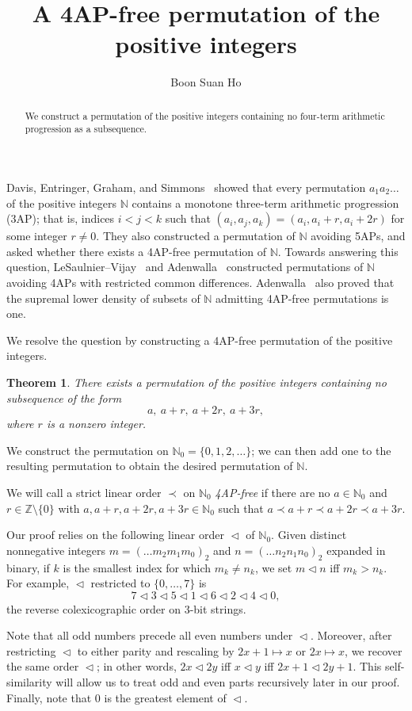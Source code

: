 \documentclass[12pt,reqno]{amsart}
\title{A 4AP-free permutation of the positive integers}
\author{Boon Suan Ho}
\date{}
\newtheorem*{theorem}{Theorem}
\newcommand{\NN}{\mathbb N}
\newcommand{\ZZ}{\mathbb Z}
\newcommand{\bits}{\mathrel{\triangleleft}}
\begin{document}
\begin{abstract}
We construct a permutation of the positive integers containing no four-term
arithmetic progression as a subsequence.
\end{abstract}

\maketitle

Davis, Entringer, Graham, and Simmons~\cite{DEGS} showed that every permutation
$a_1a_2\dots$ of the positive integers $\NN$ contains a monotone three-term
arithmetic progression (3AP); that is, indices $i<j<k$ such that
$(a_i,a_j,a_k)=(a_i,a_i+r,a_i+2r)$ for some integer $r\ne0$. They also
constructed a permutation of $\NN$ avoiding 5APs, and asked whether there exists
a 4AP-free permutation of $\NN$. Towards answering this question,
LeSaulnier--Vijay~\cite{LV} and Adenwalla~\cite{Adenwalla} constructed
permutations of $\NN$ avoiding 4APs with restricted common differences.
Adenwalla~\cite[Theorem~6]{Adenwalla} also proved that the supremal lower
density of subsets of $\NN$ admitting 4AP-free permutations is one. 

We resolve the question by constructing a 4AP-free permutation of the
positive integers.

\begin{theorem}
There exists a permutation of the positive integers containing no subsequence of
the form
$$
 a,\ a+r,\ a+2r,\ a+3r,
$$
where $r$ is a nonzero integer.
\end{theorem}
We construct the permutation on $\NN_0=\{0,1,2,\ldots\}$; we can then add one to
the resulting permutation to obtain the desired permutation of $\NN$.

We will call a strict linear order $\prec$ on $\NN_0$ \emph{4AP-free}
if there are no $a\in\NN_0$ and $r\in\ZZ\setminus\{0\}$ with
$a,a+r,a+2r,a+3r\in\NN_0$ such that $a\prec a+r\prec a+2r\prec a+3r$.

Our proof relies on the following linear order $\bits$ of $\NN_0$. Given
distinct nonnegative integers $m=(\dots m_2m_1m_0)_2$ and $n=(\dots
n_2n_1n_0)_2$ expanded in binary, if $k$ is the smallest index for which $m_k\ne
n_k$, we set $m\bits n$ iff $m_k>n_k$. For example, $\bits$ restricted to
$\{0,\ldots,7\}$ is
$$
 7\bits3\bits5\bits1\bits6\bits2\bits4\bits0,
$$
the reverse colexicographic order on $3$-bit strings.

Note that all odd numbers precede all even numbers under $\bits$. Moreover,
after restricting $\bits$ to either parity and rescaling by $2x+1\mapsto x$ or
$2x\mapsto x$, we recover the same order $\bits$; in other words, $2x\bits 2y$ iff $x\bits y$ iff $2x+1\bits 2y+1$. This self-similarity will
allow us to treat odd and even parts recursively later in our proof. Finally,
note that $0$ is the greatest element of $\bits$.
\end{document}
